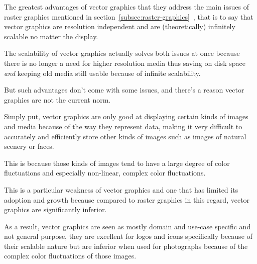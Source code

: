 \documentclass[12pt]{article}
\newcommand{\sentence}{} %
\newcommand{\italic}[1]{\textit{#1}}
\newcommand{\fullref}[1]{\ref{#1}~\nameref{#1}}
\begin{document}
    \bigskip
    The greatest advantages of vector graphics that they address the main issues of raster graphics mentioned in
    section~\fullref{subsec:raster-graphics}, that is to say that vector graphics are resolution independent
    and are (theoretically) infinitely scalable no matter the display.
    \sentence
    The scalability of vector graphics actually solves both issues at once because there is no longer a need for
    higher resolution media thus saving on disk space \italic{and} keeping old media still usable because of infinite
    scalability.
    \sentence
    But such advantages don't come with some issues, and there's a reason vector graphics are not the current norm.
    \sentence
    Simply put, vector graphics are only good at displaying certain kinds of images and media because of the way they
    represent data, making it very difficult to accurately and efficiently store other kinds of images such as images
    of natural scenery or faces.
    \sentence
    This is because those kinds of images tend to have a large degree of color fluctuations and especially
    non-linear, complex color fluctuations.
    \sentence
    This is a particular weakness of vector graphics and one that has limited its adoption and growth because
    compared to raster graphics in this regard, vector graphics are significantly inferior.
    \sentence
    As a result, vector graphics are seen as mostly domain and use-case specific and not general purpose, they are
    excellent for logos and icons specifically because of their scalable nature but are inferior when used for
    photographs because of the complex color fluctuations of those images.
\end{document}

